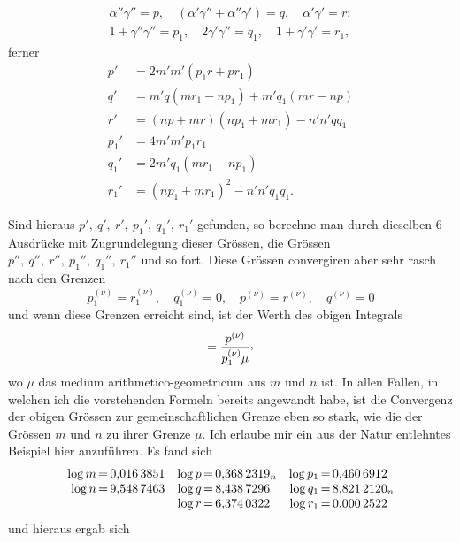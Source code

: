 \[
\begin{gathered}
\alpha''\gamma''=p,\quad(\alpha'\gamma''+\alpha''\gamma')=q,\quad\alpha'\gamma'=r;\\
1+\gamma''\gamma''=p_1,\quad2\gamma'\gamma''=q_1,\quad1+\gamma'\gamma'=r_1,
\end{gathered}
\]
ferner
\[
\begin{aligned}
p'&=2m'm'(p_1r+pr_1)\\
q'&=m'q(mr_1-np_1)+m'q_1(mr-np)\\
r'&=(np+mr)(np_1+mr_1)-n'n'qq_1\\
p_1'&=4m'm'p_1r_1\\
q_1'&=2m'q_1(mr_1-np_1)\\
r_1'&=(np_1+mr_1)^2-n'n'q_1q_1.
\end{aligned}
\]
\par Sind hieraus \(p',\ q',\ r',\ p_1',\ q_1',\ r_1'\) gefunden, so berechne man durch dieselben 6 Ausdrücke mit Zugrundelegung dieser Grössen, die Grössen \(p'',\ q'',\ r'',\ p_1'',\ q_1'',\ r_1''\) und so fort. Diese Grössen convergiren aber sehr rasch nach den Grenzen
\[
p_1^{(\nu)}=r_1^{(\nu)},\quad q_1^{(\nu)}=0,\quad p^{(\nu)}=r^{(\nu)},\quad q^{(\nu)}=0
\]
und wenn diese Grenzen erreicht sind, ist der Werth des obigen Integrals
\[
=\frac{p^{(\nu)}}{p_1^{(\nu)}\mu}\mathpunct{\raisebox{.45ex}{,}}
\]
wo \(\mu\) das medium arithmetico-geometricum aus \(m\) und \(n\) ist. In allen Fällen, in welchen ich die vorstehenden Formeln bereits angewandt habe, ist die Convergenz der obigen Grössen zur gemeinschaftlichen Grenze eben so stark, wie die der Grössen \(m\) und \(n\) zu ihrer Grenze \(\mu\). Ich erlaube mir ein aus der Natur entlehntes Beispiel hier anzuführen. Es fand sich
\[
\begin{array}{r@{\,}c@{\,}l@{\quad}r@{\,}c@{\,}l@{\quad}r@{\,}c@{\,}l}
\log m&=&0{,}016\,3851&\log p&=&0{,}368\,2319_n&\log p_1&=&0{,}460\,6912\\
\log n&=&9{,}548\,7463&\log q&=&8{,}438\,7296&\log q_1&=&8{,}821\,2120_n\\
&&&\log r&=&6{,}374\,0322&\log r_1&=&0{,}000\,2522
\end{array}
\]
und hieraus ergab sich
